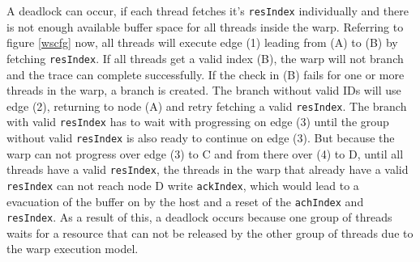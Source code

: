 	A deadlock can occur, if each thread fetches it's \verb|resIndex| individually and there is not enough available buffer space for all threads inside the warp. Referring to figure \ref{wscfg} now, all threads will execute edge (1) leading from (A) to (B) by fetching \verb|resIndex|. If all threads get a valid index (B), the warp will not branch and the trace can complete successfully.
	If the check in (B) fails for one or more threads in the warp, a branch is created. The branch without valid IDs will 
	use edge (2), returning to node (A) and retry fetching a valid \verb|resIndex|. The branch with valid \verb|resIndex|
	has to wait with progressing on edge (3) until the group without valid \verb|resIndex| is also ready to continue on edge (3).
	But because the warp can not progress over edge (3) to C and from there over (4) to D, until all threads have a valid \verb|resIndex|, the threads in the warp that already have a valid \verb|resIndex| can not reach node D write \verb|ackIndex|, which would lead to a evacuation of the buffer on by the host and a reset of the \verb|achIndex| and \verb|resIndex|. As a result of this, a deadlock occurs because one group of threads waits for a resource that can not be released by the other group
	of threads due to the warp execution model.
	
